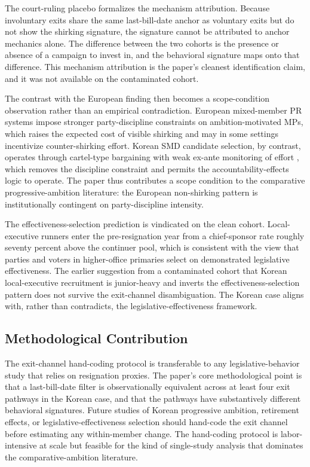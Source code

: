 \documentclass[11pt]{article}
\begin{document}
The court-ruling placebo formalizes the mechanism attribution. Because involuntary exits share the same last-bill-date anchor as voluntary exits but do not show the shirking signature, the signature cannot be attributed to anchor mechanics alone. The difference between the two cohorts is the presence or absence of a campaign to invest in, and the behavioral signature maps onto that difference. This mechanism attribution is the paper's cleanest identification claim, and it was not available on the contaminated cohort.

The contrast with the \citet{hansen2015} European finding then becomes a scope-condition observation rather than an empirical contradiction. European mixed-member PR systems impose stronger party-discipline constraints on ambition-motivated MPs, which raises the expected cost of visible shirking and may in some settings incentivize counter-shirking effort. Korean SMD candidate selection, by contrast, operates through cartel-type bargaining with weak ex-ante monitoring of effort \citep{yoon2022}, which removes the discipline constraint and permits the accountability-effects logic to operate. The paper thus contributes a scope condition to the comparative progressive-ambition literature: the European non-shirking pattern is institutionally contingent on party-discipline intensity.

The \citet{volden2024} effectiveness-selection prediction is vindicated on the clean cohort. Local-executive runners enter the pre-resignation year from a chief-sponsor rate roughly seventy percent above the continuer pool, which is consistent with the view that parties and voters in higher-office primaries select on demonstrated legislative effectiveness. The earlier suggestion from a contaminated cohort that Korean local-executive recruitment is junior-heavy and inverts the effectiveness-selection pattern does not survive the exit-channel disambiguation. The Korean case aligns with, rather than contradicts, the legislative-effectiveness framework.

\subsection{Methodological Contribution}

The exit-channel hand-coding protocol is transferable to any legislative-behavior study that relies on resignation proxies. The paper's core methodological point is that a last-bill-date filter is observationally equivalent across at least four exit pathways in the Korean case, and that the pathways have substantively different behavioral signatures. Future studies of Korean progressive ambition, retirement effects, or legislative-effectiveness selection should hand-code the exit channel before estimating any within-member change. The hand-coding protocol is labor-intensive at scale but feasible for the kind of single-study analysis that dominates the comparative-ambition literature.
\end{document}
